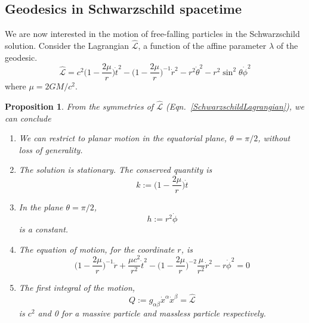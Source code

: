 \documentclass[a4paper]{article}
\theoremstyle{new}
\newtheorem{prop}{Proposition}[section]
\begin{document}
\subsection{Geodesics in Schwarzschild spacetime}
We are now interested in the motion of free-falling particles in the Schwarzschild solution. Consider the Lagrangian $\hat{\mathcal{L}}$, a function of the affine parameter $\lambda$ of the geodesic.
\begin{equation}
\hat{\mathcal{L}}=c^2\bigg(1-\frac{2\mu}{r}\bigg)\dot{t}^2-\bigg(1-\frac{2\mu}{r}\bigg)^{-1}\dot{r}^2-r^2\dot{\theta}^2-r^2\sin^2\theta\dot{\phi}^2\label{SchwarzschildLagrangian}
\end{equation}
where $\mu=2GM/c^2$. 
\begin{prop}
From the symmetries of $\hat{\mathcal{L}}$ (Eqn.~\ref{SchwarzschildLagrangian}), we can conclude
\begin{enumerate}
\item We can restrict to planar motion in the equatorial plane, $\theta=\pi/2$, without loss of generality.
\item The solution is stationary. The conserved quantity is
\begin{equation}
k:=\bigg(1-\frac{2\mu}{r}\bigg)\dot{t}\label{conservedE}
\end{equation}
\item In the plane $\theta=\pi/2$,
\begin{equation}
h:=r^2\dot{\phi}\label{conservedL}
\end{equation}
is a constant.
\item The equation of motion, for the coordinate $r$, is
$$\bigg(1-\frac{2\mu}{r}\bigg)^{-1}\ddot{r}+\frac{\mu c^2}{r^2}\dot{t}^2-\bigg(1-\frac{2\mu}{r}\bigg)^{-2}\frac{\mu}{r^2}\dot{r}^2-r\dot{\phi}^2=0$$
\item The first integral of the motion,
\begin{equation}
Q:=g_{\alpha\beta}\dot{x}^\alpha\dot{x}^\beta=\hat{\mathcal{L}}\label{firstintegral}
\end{equation}
is $c^2$ and 0 for a massive particle and massless particle respectively.
\end{enumerate}
\end{prop}
\newpage
\end{document}
